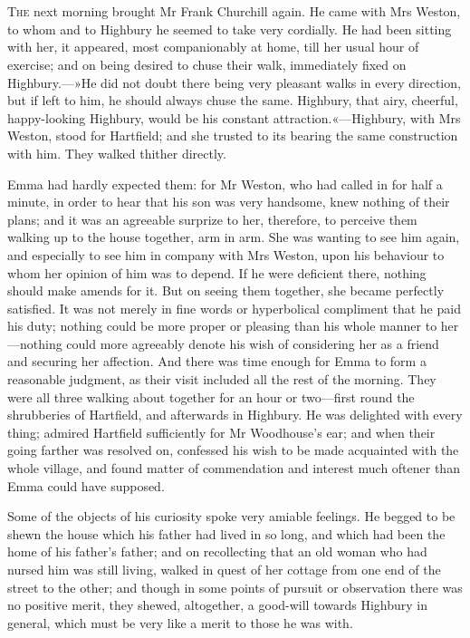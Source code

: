 \chapter[Chapter \thechapter]{}
\lettrine[lines=4,lraise=0.3]{T}{he} next morning brought Mr Frank Churchill again. He came with Mrs Weston, to whom and to Highbury he seemed to take very cordially. He had been sitting with her, it appeared, most companionably at home, till her usual hour of exercise; and on being desired to chuse their walk, immediately fixed on Highbury.—»He did not doubt there being very pleasant walks in every direction, but if left to him, he should always chuse the same. Highbury, that airy, cheerful, happy-looking Highbury, would be his constant attraction.«—Highbury, with Mrs Weston, stood for Hartfield; and she trusted to its bearing the same construction with him. They walked thither directly.

Emma had hardly expected them: for Mr Weston, who had called in for half a minute, in order to hear that his son was very handsome, knew nothing of their plans; and it was an agreeable surprize to her, therefore, to perceive them walking up to the house together, arm in arm. She was wanting to see him again, and especially to see him in company with Mrs Weston, upon his behaviour to whom her opinion of him was to depend. If he were deficient there, nothing should make amends for it. But on seeing them together, she became perfectly satisfied. It was not merely in fine words or hyperbolical compliment that he paid his duty; nothing could be more proper or pleasing than his whole manner to her—nothing could more agreeably denote his wish of considering her as a friend and securing her affection. And there was time enough for Emma to form a reasonable judgment, as their visit included all the rest of the morning. They were all three walking about together for an hour or two—first round the shrubberies of Hartfield, and afterwards in Highbury. He was delighted with every thing; admired Hartfield sufficiently for Mr Woodhouse's ear; and when their going farther was resolved on, confessed his wish to be made acquainted with the whole village, and found matter of commendation and interest much oftener than Emma could have supposed.

Some of the objects of his curiosity spoke very amiable feelings. He begged to be shewn the house which his father had lived in so long, and which had been the home of his father's father; and on recollecting that an old woman who had nursed him was still living, walked in quest of her cottage from one end of the street to the other; and though in some points of pursuit or observation there was no positive merit, they shewed, altogether, a good-will towards Highbury in general, which must be very like a merit to those he was with.

